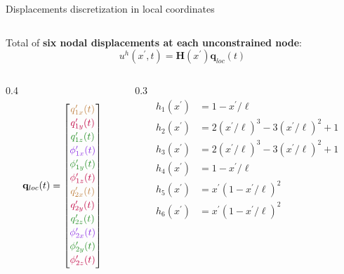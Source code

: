 \documentclass[aspectratio=169]{beamer}
\begin{document}
{\begin{frame}{Displacements discretization in local coordinates}
\begin{columns}
    \end{columns}
    \small
    Total of \textbf{six nodal displacements at each unconstrained node}:
    \vspace{0.2cm}
    $$u^h(x^\prime,t)=  \mathbf H(x^\prime)\mathbf q_{loc} (t)$$
    \vspace{-1cm}
    \begin{columns}
      \begin{column}{0.4\textwidth}
        {\tiny \[
            \mathbf q_{loc} (t)=\begin{bmatrix}
              {\color{brown} q_{1x}^\prime(t)}             \\[2pt]
              {\color{Purple} q_{1y}^\prime(t)}            \\[2pt]
              {\color{ForestGreen} q_{1z}^\prime(t)}       \\[2pt]
              {\color{BlueViolet} \phi_{1x}^\prime(t)}     \\[2pt]
              {\color{ForestGreen} \phi_{1y}^\prime(t)   } \\[2pt]
              {\color{Purple} \phi_{1z}^\prime(t)}         \\[2pt]
              {\color{brown} q_{2x}^\prime(t)}             \\[2pt]
              {\color{Purple} q_{2y}^\prime(t)}            \\[2pt]
              {\color{ForestGreen} q_{2z}^\prime(t)}       \\[2pt]
              {\color{BlueViolet} \phi_{2x}^\prime(t)}     \\[2pt]
              {\color{ForestGreen} \phi_{2y}^\prime(t)   } \\[2pt]
              {\color{Purple} \phi_{2z}^\prime(t)}         \\[2pt]
            \end{bmatrix}
          \]}
      \end{column}

      \begin{column}{0.3\textwidth}
        \tiny  \begin{align*}
          h_1(x^\prime) & = 1-x^\prime/\ell                        \\
          h_2(x^\prime) & =2(x^\prime/\ell)^3-3(x^\prime/\ell)^2+1 \\
          h_3(x^\prime) & =2(x^\prime/\ell)^3-3(x^\prime/\ell)^2+1 \\
          h_4(x^\prime) & = 1-x^\prime/\ell                        \\
          h_5(x^\prime) & =x^\prime(1-x^\prime/\ell)^2             \\
          h_6(x^\prime) & =x^\prime(1-x^\prime/\ell)^2
        \end{align*}
      \end{column}


\end{columns}
\end{frame}}
\end{document}
